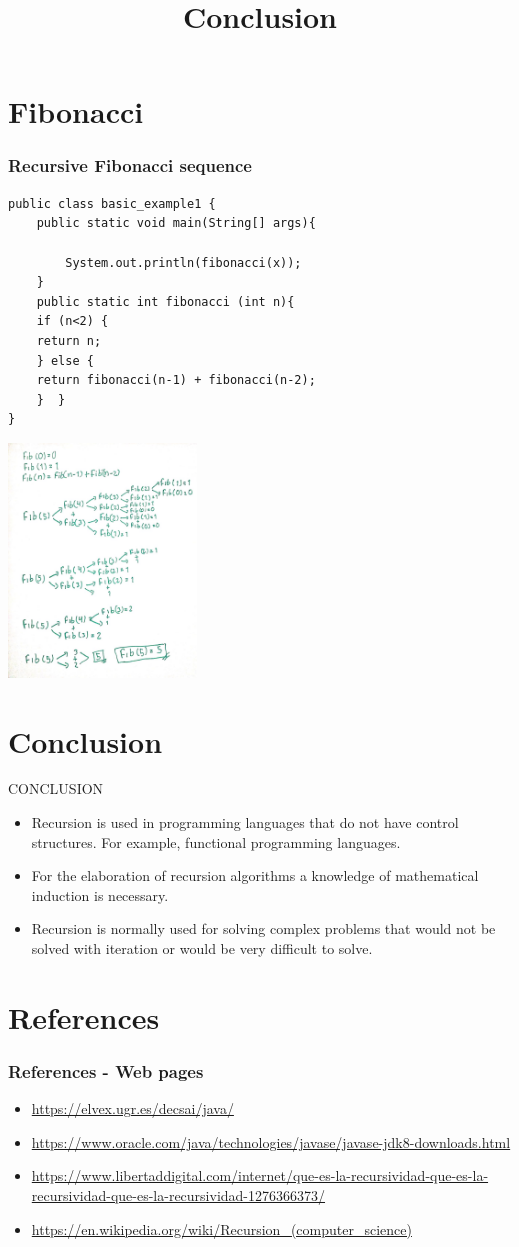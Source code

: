 \documentclass[11pt]{beamer}
\begin{document}
\section{Fibonacci}
\begin{frame}[fragile]
\frametitle{Recursive Fibonacci sequence}
\begin{verbatim}
public class basic_example1 {
	public static void main(String[] args){
		
		System.out.println(fibonacci(x));
	}
	public static int fibonacci (int n){
	if (n<2) {
	return n;
	} else {
	return fibonacci(n-1) + fibonacci(n-2);
	}  }
}
\end{verbatim}
\end{frame}
\begin{frame}[fragile]
\includegraphics[width=5cm]{IMGS/4e7fe607-955d-4165-87a4-adca4a9c0d6b.jpg}
\end{frame}

\section{Conclusion}
\title{Conclusion}
CONCLUSION
\begin{itemize}
\item Recursion is used in programming languages that do not have control structures. For example, functional programming languages.
\item For the elaboration of recursion algorithms a knowledge of mathematical induction is necessary.
\item Recursion is normally used for solving complex problems that would not be solved with iteration or would be very difficult to solve.
\end{itemize}

\section{References}
\begin{frame}
\frametitle{References - Web pages}
\begin{itemize}
\item \url{https://elvex.ugr.es/decsai/java/}%
\item \url{https://www.oracle.com/java/technologies/javase/javase-jdk8-downloads.html}%
\item \url{https://www.libertaddigital.com/internet/que-es-la-recursividad-que-es-la-recursividad-que-es-la-recursividad-1276366373/}
\item \url{https://en.wikipedia.org/wiki/Recursion_(computer_science)}
\end{itemize}
\end{frame}
\end{document}
